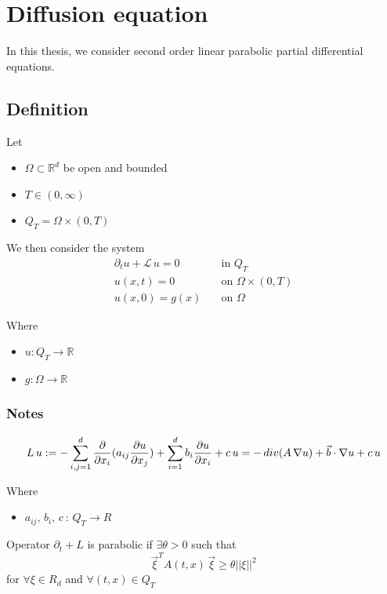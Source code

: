 \chapter{Diffusion equation}

In this thesis, we consider second order linear parabolic partial differential equations.


\section{Definition}

Let
\begin{itemize}
\item $\Omega \subset \mathbb{R}^d$ be open and bounded
\item $T \in (0, \infty)$
\item $Q_T = \Omega\times(0,T)$
\end{itemize}

We then consider the system
\begin{align*}
\partial_t u + \mathcal{L}\,u = 0\quad &\text{in } Q_T \\
u(x,t) = 0\quad &\text{on } \Omega \times (0,T) \\
u(x,0) = g(x)\quad &\text{on } \Omega
\end{align*}

Where
\begin{itemize}
\item $u: Q_T \to \mathbb{R}$
\item $g: \Omega \to \mathbb{R}$
\end{itemize}

\subsection{Notes}

\[
L\,u := - \sum_{i,j=1}^d \frac{\partial}{\partial x_i}(a_{ij}\frac{\partial u}{\partial x_j}) + \sum_{i=1}^d b_i \frac{\partial u}{\partial x_i} + c\, u \\
= -\,div (A \, \nabla u) + \vec{b} \cdot \nabla u + c\, u
\]

Where 
\begin{itemize}
\item $ a_{ij},\, b_i,\, c \: : \, Q_T \to R $
\end{itemize}


Operator $\partial_t + L$ is parabolic if $\exists \theta>0$ such that
\[
\vec{\xi}^T A(t,x)\,\vec{\xi} \ge \theta ||\xi||^2
\]
for 
$ \forall \xi\in R_d $
and 
$ \forall(t,x)\in Q_T $


